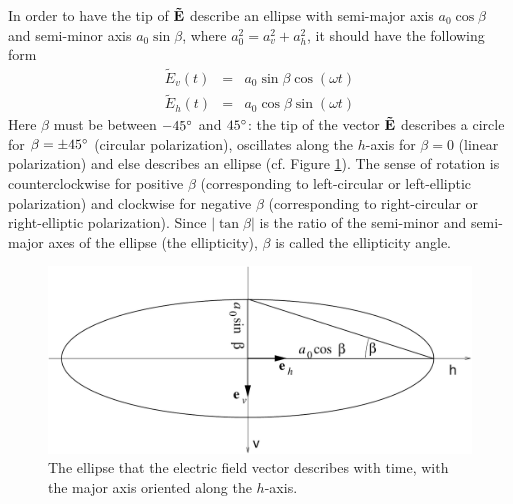 In order to have the tip of $\mathbf{\tilde{E}}$ describe an ellipse with semi-major axis $a_0 \cos\beta$
and
semi-minor axis $a_0 \sin\beta$, where $a_0^2 = a_v^2 + a_h^2$, 
it should have the following form
\begin{eqnarray}
  \label{eq:polarization:ellipse_parallel}
 \tilde{E}_v (t) &=&   a_0 \sin\beta \cos(\omega t)\\
 \tilde{E}_h (t) &=&   a_0 \cos\beta \sin(\omega t)
\end{eqnarray}
Here $\beta$ must be between $-45^\circ$ and $45^\circ$: the tip of
the vector $\mathbf{\tilde{E}}$ describes a circle for $\beta = \pm
45^\circ$ (circular polarization), oscillates along the $h$-axis for
$\beta = 0$ (linear polarization) and else describes an ellipse (cf.
Figure \ref{fig:polarization:ellipse_aligned}). The sense of rotation
is counterclockwise for positive $\beta$ (corresponding to left-circular
or left-elliptic polarization) and clockwise for negative
$\beta$ (corresponding to right-circular
or right-elliptic polarization).
Since $|\tan\beta|$ is the ratio of the semi-minor and semi-major axes
of the ellipse (the ellipticity), $\beta$ is called the ellipticity
angle.\label{def:ellipticity-angle}
\begin{figure}
 \begin{center}
  \begin{minipage}[c]{0.9\textwidth}
   \begin{center}
    \includegraphics*[width=0.9\hsize]{pol_ellipse_aligned}
   \end{center}
  \end{minipage}
  \begin{minipage}[c]{0.9\textwidth}
   \caption{The ellipse that the electric field vector describes with
     time, with the major axis oriented along the $h$-axis.}
   \label{fig:polarization:ellipse_aligned}
  \end{minipage}
 \end{center}
\end{figure}   
